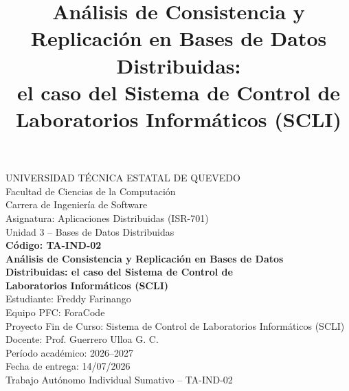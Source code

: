 \documentclass[conference]{IEEEtran}
\begin{document}
\begin{titlepage}
\begin{center}
\vspace*{1.5cm}
{\large UNIVERSIDAD T\'ECNICA ESTATAL DE QUEVEDO}\\[0.3cm]
{\normalsize Facultad de Ciencias de la Computaci\'on}\\[0.2cm]
{\normalsize Carrera de Ingenier\'ia de Software}\\[1.2cm]

{\normalsize Asignatura: Aplicaciones Distribuidas (ISR-701)}\\[0.2cm]
{\normalsize Unidad 3 -- Bases de Datos Distribuidas}\\[1.2cm]

{\large\bfseries C\'odigo: TA-IND-02}\\[0.6cm]

{\Large\bfseries An\'alisis de Consistencia y Replicaci\'on en Bases de Datos\\
Distribuidas: el caso del Sistema de Control de\\
Laboratorios Inform\'aticos (SCLI)}\\[1.5cm]

{\normalsize Estudiante: Freddy Farinango}\\[0.2cm]
{\normalsize Equipo PFC: ForaCode}\\[0.2cm]
{\normalsize Proyecto Fin de Curso: Sistema de Control de Laboratorios Inform\'aticos (SCLI)}\\[1.2cm]

{\normalsize Docente: Prof. Guerrero Ulloa G. C.}\\[0.2cm]
{\normalsize Per\'iodo acad\'emico: 2026--2027}\\[0.2cm]
{\normalsize Fecha de entrega: 14/07/2026}\\[1.5cm]

\vfill
{\small Trabajo Aut\'onomo Individual Sumativo -- TA-IND-02}
\end{center}
\end{titlepage}

\twocolumn

\title{An\'alisis de Consistencia y Replicaci\'on en Bases de Datos Distribuidas:\\
el caso del Sistema de Control de Laboratorios Inform\'aticos (SCLI)}
\end{document}
